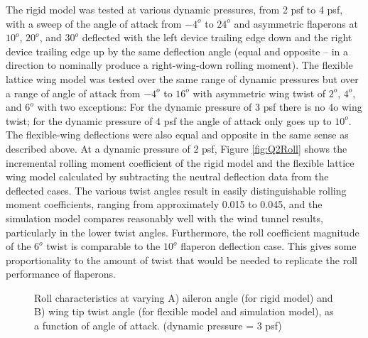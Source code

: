 \documentclass[11pt]{ucthesis}
\begin{document}
The rigid model was tested at various dynamic pressures, from 2 psf to 4 psf, with a sweep of the angle of attack from $−4^o$ to $24^o$ and asymmetric flaperons at $10^o$, $20^o$, and $30^o$ deflected with the left device trailing edge down and the right device trailing edge up by the same deflection angle (equal and opposite – in a direction to nominally produce a right-wing-down rolling moment).  The flexible lattice wing model was tested over the same range of dynamic pressures but over a range of angle of attack from $−4^o$ to $16^o$ with asymmetric wing twist of $2^o$, $4^o$, and $6^o$ with two exceptions:  For the dynamic pressure of 3 psf there is no 4o wing twist; for the dynamic pressure of 4 psf the angle of attack only goes up to $10^o$.  The flexible-wing deflections were also equal and opposite in the same sense as described above.  At a dynamic pressure of 2 psf, Figure \ref{fig:Q2Roll} shows the incremental rolling moment coefficient of the rigid model and the flexible lattice wing model calculated by subtracting the neutral deflection data from the deflected cases. The various twist angles result in easily distinguishable rolling moment coefficients, ranging from approximately 0.015 to 0.045, and the simulation model compares reasonably well with the wind tunnel results, particularly in the lower twist angles. Furthermore, the roll coefficient magnitude of the $6^o$ twist is comparable to the $10^o$ flaperon deflection case. This gives some proportionality to the amount of twist that would be needed to replicate the roll performance of flaperons.

\begin{figure}[thpb]
\hfill
{}
\hfill
{}
\hfill
\caption{Roll characteristics at varying A) aileron angle (for rigid model) and B) wing tip twist angle (for flexible model and simulation model), as a function of angle of attack. (dynamic pressure = 3 psf)}
\label{fig:Q3Roll}
\end{figure}
\end{document}
